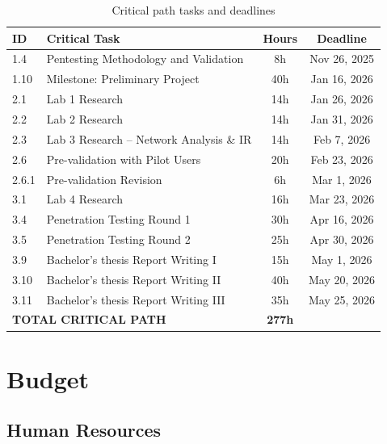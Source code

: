 \begin{table}[H]
  \centering
  \small
  \setlength{\tabcolsep}{4pt}
  \renewcommand{\arraystretch}{1.1}
  \begin{tabularx}{\textwidth}{lXcc}
    \toprule
    \textbf{ID} & \textbf{Critical Task} & \textbf{Hours} & \textbf{Deadline} \\
    \midrule
    1.4   & Pentesting Methodology and Validation           & 8h  & Nov 26, 2025 \\
    1.10  & Milestone: Preliminary Project                  & 40h & Jan 16, 2026 \\
    2.1   & Lab 1 Research                                  & 14h & Jan 26, 2026 \\
    2.2   & Lab 2 Research                                  & 14h & Jan 31, 2026 \\
    2.3   & Lab 3 Research -- Network Analysis \& IR        & 14h & Feb 7, 2026  \\
    2.6   & Pre-validation with Pilot Users                 & 20h & Feb 23, 2026 \\
    2.6.1 & Pre-validation Revision                         & 6h  & Mar 1, 2026  \\
    3.1   & Lab 4 Research                                  & 16h & Mar 23, 2026 \\
    3.4   & Penetration Testing Round 1                     & 30h & Apr 16, 2026 \\
    3.5   & Penetration Testing Round 2                     & 25h & Apr 30, 2026 \\
    3.9   & Bachelor's thesis Report Writing I              & 15h & May 1, 2026  \\
    3.10  & Bachelor's thesis Report Writing II             & 40h & May 20, 2026 \\
    3.11  & Bachelor's thesis Report Writing III            & 35h & May 25, 2026 \\
    \midrule
    \multicolumn{2}{l}{\textbf{TOTAL CRITICAL PATH}} & \textbf{277h} & \\
    \bottomrule
  \end{tabularx}
  \caption[Critical path tasks]{Critical path tasks and deadlines}
  \label{tab:critical_task}
\end{table}

\section{Budget}

\subsection{Human Resources}

